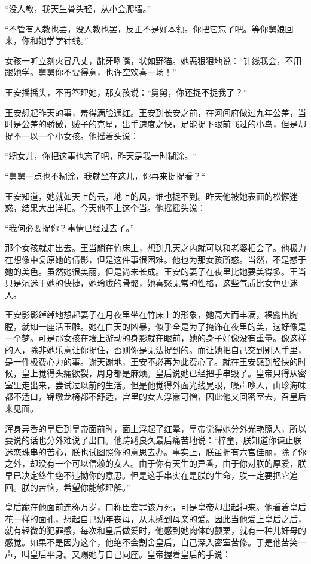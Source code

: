 “没人教，我天生骨头轻，从小会爬墙。” 

“不管有人教也罢，没人教也罢，反正不是好本领。你把它忘了吧。等你舅娘回来，你和她学学针线。” 

女孩一听立刻火冒八丈，龀牙咧嘴，状如野猫。她恶狠狠地说：“针线我会，不用跟她学。舅舅你不要得意，也许空欢喜一场！” 

王安摇摇头，不再答理她，那女孩说：“舅舅，你还捉不捉我了？” 

王安想起昨天的事，羞得满脸通红。王安到长安之前，在河间府做过九年公差，当时是公差的骄傲，贼子的克星，出手速度之快，足能捉下眼前飞过的小鸟，但是却捉不一以一个小女孩。他摇着头说： 

“甥女儿，你把这事也忘了吧，昨天是我一时糊涂。“ 

“舅舅一点也不糊涂，我就坐在这儿，你再来捉捉看？“ 

王安知道，她就如天上的云，地上的风，谁也捉不到。昨天他被她表面的松懈迷惑，结果大出洋相。今天他不上这个当。他摇摇头说： 

“我何必要捉你？事情已经过去了。” 

那个女孩就走出去。王当躺在竹床上，想到几天之内就可以和老婆相会了。他极力在想像中复原她的倩影，但是这件事很困难。他也为那女孩所惑。当然，不是惑于她的美色。虽然她很美丽，但是尚未长成。王安的妻子在夜里比她要美得多。王当只是沉迷于她的快捷，她玲珑的骨骼，她喜怒无常的性格，这些气质比女色更迷人。 

王安影影绰绰地想起妻子在月夜里坐在竹床上的形象，她高大而丰满，裸露出胸膛，就如一座活玉雕。她在白天的凶暴，似乎全是为了掩饰在夜里的美，这好像是一个梦。可是那女孩在墙上游动的身影就在眼前，她的身子好像没有重量。像这样的人，除非她乐意让你捉住，否则你是无法捉到的。而让她把自己交到别人手里，是一件极费心力的事。谢天谢地，王安不必再为此费心了。就在王安感到轻快的时候，皇上觉得头痛欲裂，周身都是麻烦。皇后说她已经把手串毁了。皇帝只得从密室里走出来，尝试过以前的生活。但是他觉得外面光线晃眼，噪声吵人，山珍海味都不适口，锦墩龙椅都不舒适，宫里的女人浮嚣可憎，因此他又回密室去，召皇后来见面。 

浑身异香的皇后到皇帝面前时，面上浮起了红晕，皇帝觉得她分外光艳照人，所以要说的话也分外难说了出口。他踌躇良久最后痛苦地说：“梓童，朕知道你谏止朕迷恋珠串的苦心，朕也试图照你的意思去办。事实上，朕虽拥有六宫佳丽，除了你之外，却没有一个可以信赖的女人。由于你有天生的异香，由于你对朕的厚爱，朕早已决定终生绝不违拗你的意思。但是这手串实在是朕的生命，朕一定要把它追回。朕的苦恼，希望你能够理解。” 

皇后跪在他面前连称万岁，口称臣妾罪该万死，可是皇帝却出起神来。他看着皇后花一样的面孔，想起自己幼年丧母，从未感到母亲的爱。因此当他爱上皇后之后，就有轻微的犯罪感，每次和皇后做爱时，他感到她肉体的颤栗，就有一种儿奸母的感觉。如果不是因为这个，他绝不会割舍皇后，自己深入密室苦修。于是他苦笑一声，叫皇后平身。又赐她与自己同座。皇帝握着皇后的手说： 

